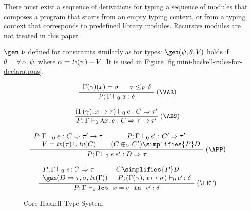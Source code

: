 
There must exist a sequence of derivations for typing a sequence of
modules that composes a program that starts from an empty typing
context, or from a typing context that corresponds to predefined
library modules. Recursive modules are not treated in this paper.

$\gen$ is defined for constraints similarly as for types:
$\gen(\psi,\theta,V)$ holds if
$\theta=\forall\,\overline{\alpha}.\,\psi$, where
$\overline{\alpha}=\text{\it tv\/}(\psi) - V$. It is used in Figure
\ref{fig:mini-haskell-rules-for-declarations}.


\begin{figure}
\[ \begin{array}{cc}
      \displaystyle\frac
        {\begin{array}[t]{lll}
           \Gamma(\gamma)(x) = \sigma\ & \:\sigma \leq_P \delta
         \end{array}}
        {P;\Gamma \vdash_0 x: \delta} \:(\VAR) \\ \\

	\displaystyle\frac
          {(\Gamma(\gamma),x \mapsto \tau) \vdash_0 e: C \Rightarrow \tau'}
	  {P;\Gamma \vdash_0 \lambda x.\:e: C\Rightarrow \tau \rightarrow \tau'} \:(\ABS)  \\ \\

	\displaystyle\frac
	  {\begin{array}[t]{cc}
             P;\Gamma \vdash_0 e: C \Rightarrow \tau' \rightarrow \tau\: &\:
             P;\Gamma \vdash_0 e': C' \Rightarrow \tau' \\
             V = \tv(\tau) \cup \tv(C) & (C \oplus_V C') \simplifies{P} D
           \end{array}}
	{P;\Gamma \vdash_0 e\:e': D\Rightarrow \tau} \:(\APP) \\ \\

	\displaystyle\frac
	 {\begin{array}{ll}
            P;\Gamma \vdash_0 e\!:C \Rightarrow \tau & C \simplifies{P} D\\
             \gen(D\Rightarrow \tau,\sigma,\tv(\Gamma))\: & \:P;(\Gamma(\gamma),x \mapsto\sigma) \vdash_0 e'\!:\delta
          \end{array}}
	 {P;\Gamma \vdash_0 \mlet\ x=e\ \iin\ e':\delta} \:(\LET)
\end{array} \]
\caption{Core-Haskell Type System}
\label{fig:core-haskell-type-system}
\end{figure}


